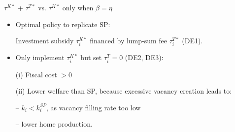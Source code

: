 \documentclass[9pt,xcolor={svgnames}]{beamer}
\begin{document}
\begin{frame}{$\tau^{K*}$ + $\tau^{T*}$  vs. $\tau^{K*}$ only when $\beta= \eta$}



\begin{itemize}
    

\item Optimal policy to replicate SP: 

Investment subsidy $\tau^{K*}_i$ financed by lump-sum fee $\tau^{T*}_i$ (DE1).



\vspace{3mm}

\item Only implement $\tau^{K*}_i$ but set $\tau^T_i=0$ (DE2, DE3):

(i)  Fiscal cost $>0$

(ii) Lower welfare than SP, because  excessive vacancy creation leads to: 

--  $k_i< k_i^{SP}$, as vacancy filling rate too low

-- lower home production. 




\end{itemize}


\end{frame}
\end{document}

